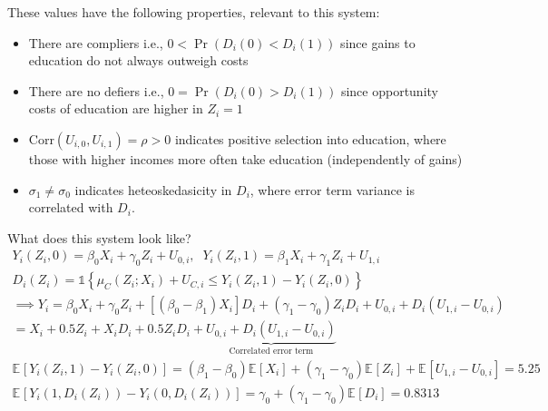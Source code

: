 \documentclass[a4paper, 12pt]{article}                                     %
\renewcommand{\vec}[1]{\boldsymbol{\mathit{#1}}}                           %
\newcommand{\Prob}[1]{\Pr\left( #1 \right)}                         %
\newcommand{\E}[2][]{\mathbb{E}_{#1} \left[ #2 \right]}                    %
\newcommand{\indicator}[1]{\mathds{1}\left\{ #1 \right\}}                  %
\begin{document}
These values have the following properties, relevant to this system:
\begin{itemize}
    \item There are compliers i.e., $0 < \Prob{D_i(0) < D_i(1)}$ since gains to education do not always outweigh costs
    \item There are no defiers i.e., $0 = \Prob{D_i(0) > D_i(1)}$ since opportunity costs of education are higher in $Z_i = 1$
    \item $\text{Corr}(U_{i,0}, U_{i,1}) = \rho > 0$ indicates positive selection into education, where those with higher incomes more often take education (independently of gains)
    \item $\sigma_1 \neq \sigma_0$ indicates heteoskedasicity in $D_i$, where error term variance is correlated with $D_i$.
\end{itemize}
What does this system look like?
\begin{align*}
    Y_i(Z_i, 0) = \beta_0 \vec X_i + \gamma_0 Z_i + U_{0,i}, \;\;
    Y_i(Z_i, 1) = \beta_1 \vec X_i + \gamma_1 Z_i + U_{1,i} \\
    D_i(Z_i) = \indicator{\mu_C(Z_i; \vec X_i) + U_{C,i} \leq Y_i(Z_i, 1) - Y_i(Z_i, 0)} \\
    \implies 
    Y_i = \beta_0 \vec X_i 
        + \gamma_0 Z_i +
        \left[ (\beta_0 - \beta_1)\vec X_i\right] D_i +
        (\gamma_1 - \gamma_0) Z_i D_i
        + U_{0,i} + D_i \left( U_{1,i} - U_{0,i} \right) \\
        = \vec X_i 
        + 0.5 Z_i +
        \vec X_i D_i +
        0.5 Z_i D_i
        + \underbrace{U_{0,i} + D_i \left( U_{1,i} - U_{0,i} \right)}_{
            \text{Correlated error term}} \\
        \E{Y_i(Z_i, 1) - Y_i(Z_i, 0)} =
        (\beta_1 - \beta_0) \E{\vec X_i} + (\gamma_1 - \gamma_0) \E{Z_i} + \E{U_{1,i} - U_{0,i}} =  5.25 \\
        \E{Y_i(1, D_i(Z_i)) - Y_i(0, D_i(Z_i))} =
            \gamma_0 + (\gamma_1 - \gamma_0)\E{D_i} = 0.8313
\end{align*}
\end{document}
